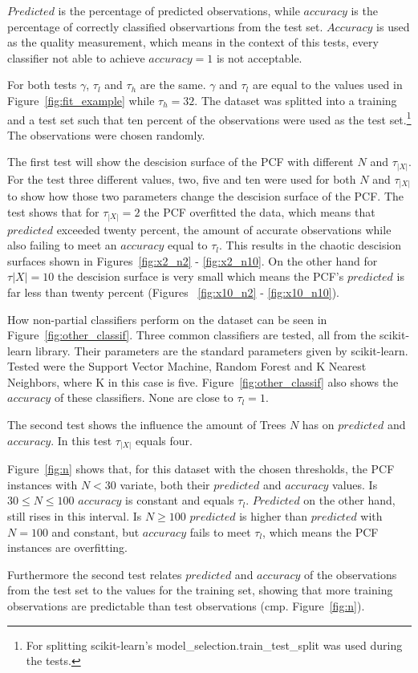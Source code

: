 $Predicted$ is the percentage of predicted observations,
while $accuracy$ is the percentage of correctly classified
observartions from the test set. $Accuracy$ is used as the
quality measurement, which means in the context of this
tests, every classifier not able to achieve $accuracy = 1$
is not acceptable.

For both tests $\gamma$, $\tau_l$ and $\tau_h$ are the
same. $\gamma$ and $\tau_l$ are equal to the values used in
Figure~\ref{fig:fit_example} while $\tau_h = 32$. The
dataset was splitted into a training and a test set such
that ten percent of the observations were used as the test
set.\footnote{For splitting scikit-learn's
  model\_selection.train\_test\_split was used during the
  tests.\cite{sklearn_api}} The observations were chosen
randomly.

The first test will show the descision surface of the PCF
with different $N$ and $\tau_{|X|}$. For the test three
different values, two, five and ten were used for both $N$
and $\tau_{|X|}$ to show how those two parameters change
the descision surface of the PCF. The test shows that for
$\tau_{|X|} = 2$ the PCF overfitted the data, which means
that $predicted$ exceeded twenty percent, the amount of
accurate observations while also failing to meet an
$accuracy$ equal to $\tau_l$. This results in the chaotic
descision surfaces shown in Figures~\ref{fig:x2_n2} -
\ref{fig:x2_n10}. On the other hand for $\tau{|X|} = 10$
the descision surface is very small which means the PCF's
$predicted$ is far less than twenty percent (Figures~%
\ref{fig:x10_n2} - \ref{fig:x10_n10}).

How non-partial classifiers perform on the dataset can be
seen in Figure~\ref{fig:other_classif}. Three common
classifiers are tested, all from the scikit-learn library.%
\cite{sklearn_api} Their parameters are the standard
parameters given by scikit-learn. Tested were the Support
Vector Machine, Random Forest and K Nearest Neighbors,
where K in this case is five.\cite{sklearn_api}
Figure~\ref{fig:other_classif} also shows the $accuracy$ of
these classifiers. None are close to $\tau_l = 1$.

The second test shows the influence the amount of Trees $N$
has on $predicted$ and $accuracy$. In this test
$\tau_{|X|}$ equals four.

Figure~\ref{fig:n} shows that, for this dataset with the
chosen thresholds, the PCF instances with $N < 30$ variate,
both their $predicted$ and $accuracy$ values. Is $30 \leq N
\leq 100$ $accuracy$ is constant and equals $\tau_l$.
$Predicted$ on the other hand, still rises in this
interval. Is $N \geq 100$ $predicted$ is higher than
$predicted$ with $N = 100$ and constant, but $accuracy$
fails to meet $\tau_l$, which means the PCF instances are
overfitting.

Furthermore the second test relates $predicted$ and
$accuracy$ of the observations from the test set to the
values for the training set, showing that more training
observations are predictable than test observations
(cmp. Figure~\ref{fig:n}).




